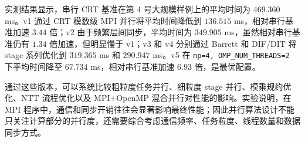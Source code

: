 \documentclass[a4paper]{article}
\begin{document}
实测结果显示，串行 CRT 基准在第 4 号大规模样例上的平均时间为 $469.360$ ms。v1 通过 CRT 模数级 MPI 并行将平均时间降低到 $136.515$ ms，相对串行基准加速 $3.44$ 倍；v2 由于频繁层间同步，平均时间为 $349.905$ ms，虽然相对串行基准仍有 $1.34$ 倍加速，但明显慢于 v1；v3 和 v4 分别通过 Barrett 和 DIF/DIT 将 stage 系列优化到 $319.365$ ms 和 $290.947$ ms。v5 在 \texttt{np=4, OMP\_NUM\_THREADS=2} 下平均时间降至 $67.734$ ms，相对串行基准加速 $6.93$ 倍，是最优配置。

通过这些版本，可以系统比较粗粒度任务并行、细粒度 stage 并行、模乘规约优化、NTT 流程优化以及 MPI+OpenMP 混合并行对性能的影响。实验说明，在 MPI 程序中，通信和同步开销往往会显著影响最终性能；因此并行算法设计不能只关注计算部分的并行度，还需要综合考虑通信频率、任务粒度、线程数量和数据同步方式。
\end{document}
